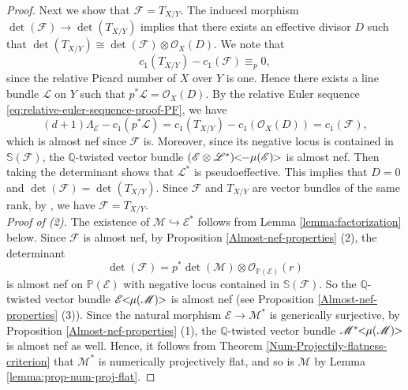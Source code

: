 \documentclass[english,reqno]{amsart}
\newcommand\bbP{{\mathbb P}}
\newcommand\bbQ{{\mathbb Q}}
\newcommand\bbS{{\mathbb S}}
\newcommand\sE{{\mathscr E}}
\newcommand\sF{{\mathscr F}}
\newcommand\sL{{\mathscr L}}
\newcommand\sM{{\mathscr M}}
\newcommand\sO{{\mathscr O}}
\theoremstyle{plain}
\theoremstyle{definition}
\numberwithin{equation}{section} %
\begin{document}
\begin{proof}
    Next we show that $\sF=T_{X/Y}$.   The induced morphism $\det(\sF)\rightarrow \det(T_{X/Y})$ implies that there exists an effective divisor $D$ such that $\det(T_{X/Y})\cong  \det(\sF)\otimes\sO_X(D)$.
    We note that $$c_1(T_{X/Y})-c_1(\sF) \equiv_p 0, $$ since the relative Picard number of $X$ over $Y$ is one.
    Hence there exists a line bundle $\sL$ on $Y$ such that $p^*\sL=\sO_X(D)$.
    By the relative Euler sequence \eqref{eq:relative-euler-sequence-proof-PF},  we have
    \[(d+1)\Lambda_{\sE}-c_1(p^*\sL)=c_1(T_{X/Y})-c_1(\sO_X(D))=c_1(\sF),\]
    which is almost nef since $\sF$ is. Moreover, since its negative locus is contained in $\bbS(\sF)$, the $\bbQ$-twisted vector bundle $(\sE\otimes \sL^*)\hspace{-0.8ex}<\hspace{-0.8ex} -\mu(\sE)\hspace{-0.8ex}>$ is almost nef. Then taking the determinant shows that $\sL^*$ is pseudoeffective.
    This implies that   $D=0$ and $\det(\sF)=\det(T_{X/Y})$. Since $\sF$ and $T_{X/Y}$ are vector bundles of the same rank, by \cite[Lemma 1.20]{DemaillyPeternellSchneider1994}, we have $\sF=T_{X/Y}$.\\

    \textit{Proof of (2).} The existence of $\sM \hookrightarrow \sE^*$ follows from Lemma \ref{lemma:factorization} below.
     Since $\sF$ is almost nef, by Proposition \ref{Almost-nef-properties} (2), the determinant
    \[\det(\sF)=p^*\det(\sM)\otimes\sO_{\bbP(\sE)}(r)\]
    is almost nef on $\bbP(\sE)$ with negative locus contained in $\bbS(\sF)$. So the $\bbQ$-twisted vector bundle $\sE\hspace{-0.8ex}<\hspace{-0.8ex} \mu(\sM) \hspace{-0.8ex}>$ is almost nef (see Proposition \ref{Almost-nef-properties} (3)). Since the natural morphism $\sE\rightarrow \sM^*$ is generically surjective, by Proposition \ref{Almost-nef-properties} (1), the $\bbQ$-twisted vector bundle $\sM^*\hspace{-0.8ex}<\hspace{-0.8ex} \mu(\sM) \hspace{-0.8ex}>$ is almost nef as well. Hence, it follows from Theorem \ref{Num-Projectily-flatness-criterion} that $\sM^*$ is numerically projectively flat, and so is $\sM$ by Lemma \ref{lemma:prop-num-proj-flat}.


\end{proof}
\end{document}
